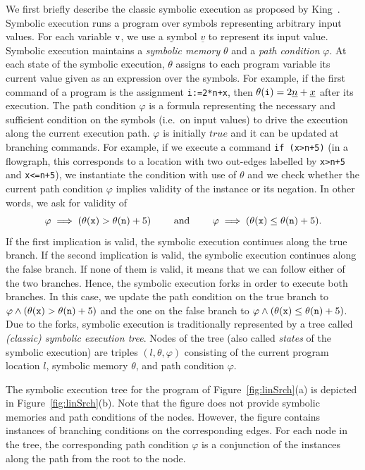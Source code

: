 \documentclass{sig-alternate}%
\newcommand{\true}{\ensuremath{\mathit{true}}}
\newcommand{\var}[1]{{\tt #1}}
\newcommand{\sym}[1]{\ensuremath{\underline{#1}}}
\begin{document}
We first briefly describe the classic symbolic execution as proposed by
King~\cite{Kin76}. Symbolic execution runs a program over symbols
representing arbitrary input values. For each variable $\var{v}$, we use a
symbol $\sym{v}$ to represent its input value.
Symbolic execution maintains a \emph{symbolic memory} $\theta$ and a
\emph{path condition} $\varphi$. At each state of the symbolic execution,
$\theta$ assigns to each program variable its current value given as an
expression over the symbols. For example, if the first command of a program
is the assignment \texttt{i:=2*n+x}, then $\theta(\var{i})=2\sym{n}+\sym{x}$
after its execution. The path condition $\varphi$ is a formula representing
the necessary and sufficient condition on the symbols (i.e.~on input values)
to drive the execution along the current execution path. $\varphi$ is
initially $\true$ and it can be updated at branching commands. For example,
if we execute a command \texttt{if~(x>n+5)} (in a flowgraph, this
corresponds to a location with two out-edges labelled by \texttt{x>n+5} and
\texttt{x<=n+5}), we instantiate the condition with use of $\theta$ and we
check whether the current path condition $\varphi$ implies validity of the
instance or its negation. In other words, we ask for validity of
\[
\varphi\implies(\theta(\var{x})>\theta(\var{n})+5)
~~~~~~~\textrm{and}~~~~~~~
\varphi\implies(\theta(\var{x})\le\theta(\var{n})+5).
\] 
If the first implication is valid, the symbolic execution continues along
the true branch. If the second implication is valid, the symbolic execution
continues along the false branch. If none of them is valid, it means that we
can follow either of the two branches. Hence, the symbolic execution forks
in order to execute both branches. In this case, we update the path
condition on the true branch to
$\varphi\wedge(\theta(\var{x})>\theta(\var{n})+5)$ and the one on the false
branch to $\varphi\wedge(\theta(\var{x})\le\theta(\var{n})+5)$. Due to the
forks, symbolic execution is traditionally represented by a tree called
\emph{(classic) symbolic execution tree}. Nodes of the tree (also called
\emph{states} of the symbolic execution) are triples $(l,\theta,\varphi)$
consisting of the current program location $l$, symbolic memory $\theta$,
and path condition $\varphi$.

The symbolic execution tree for the program of Figure~\ref{fig:linSrch}(a)
is depicted in Figure~\ref{fig:linSrch}(b). Note that the figure does not
provide symbolic memories and path conditions of the nodes. However, the
figure contains instances of branching conditions on the corresponding
edges. For each node in the tree, the corresponding path condition $\varphi$
is a conjunction of the instances along the path from the root to the node.
\end{document}

